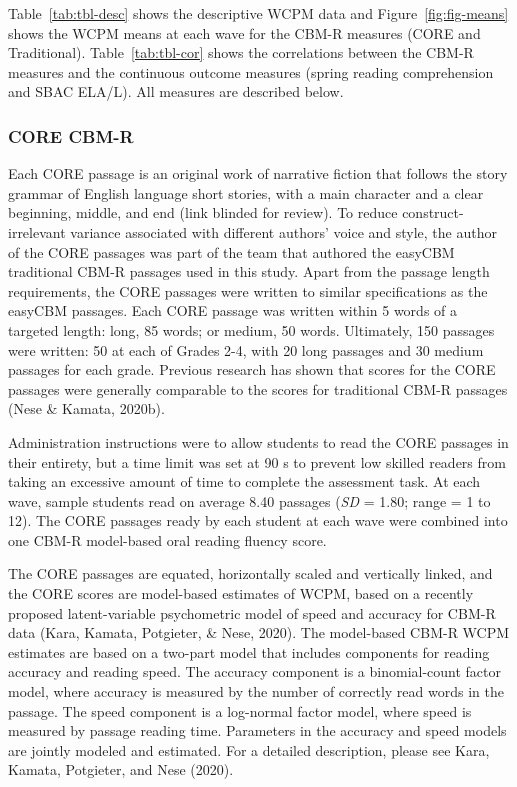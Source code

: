 \documentclass[
  english,
  man, fleqn, noextraspace]{apa6}
\begin{document}
Table~\ref{tab:tbl-desc} shows the descriptive WCPM data and Figure~\ref{fig:fig-means} shows the WCPM means at each wave for the CBM-R measures (CORE and Traditional). Table~\ref{tab:tbl-cor} shows the correlations between the CBM-R measures and the continuous outcome measures (spring reading comprehension and SBAC ELA/L). All measures are described below.

\hypertarget{core-cbm-r}{%
\subsubsection{CORE CBM-R}\label{core-cbm-r}}

Each CORE passage is an original work of narrative fiction that follows the story grammar of English language short stories, with a main character and a clear beginning, middle, and end (link blinded for review). To reduce construct-irrelevant variance associated with different authors' voice and style, the author of the CORE passages was part of the team that authored the easyCBM traditional CBM-R passages used in this study. Apart from the passage length requirements, the CORE passages were written to similar specifications as the easyCBM passages. Each CORE passage was written within 5 words of a targeted length: long, 85 words; or medium, 50 words. Ultimately, 150 passages were written: 50 at each of Grades 2-4, with 20 long passages and 30 medium passages for each grade. Previous research has shown that scores for the CORE passages were generally comparable to the scores for traditional CBM-R passages (Nese \& Kamata, 2020b).

Administration instructions were to allow students to read the CORE passages in their entirety, but a time limit was set at 90 s to prevent low skilled readers from taking an excessive amount of time to complete the assessment task. At each wave, sample students read on average 8.40 passages (\emph{SD} = 1.80; range = 1 to 12). The CORE passages ready by each student at each wave were combined into one CBM-R model-based oral reading fluency score.

The CORE passages are equated, horizontally scaled and vertically linked, and the CORE scores are model-based estimates of WCPM, based on a recently proposed latent-variable psychometric model of speed and accuracy for CBM-R data (Kara, Kamata, Potgieter, \& Nese, 2020). The model-based CBM-R WCPM estimates are based on a two-part model that includes components for reading accuracy and reading speed. The accuracy component is a binomial-count factor model, where accuracy is measured by the number of correctly read words in the passage. The speed component is a log-normal factor model, where speed is measured by passage reading time. Parameters in the accuracy and speed models are jointly modeled and estimated. For a detailed description, please see Kara, Kamata, Potgieter, and Nese (2020).
\end{document}
